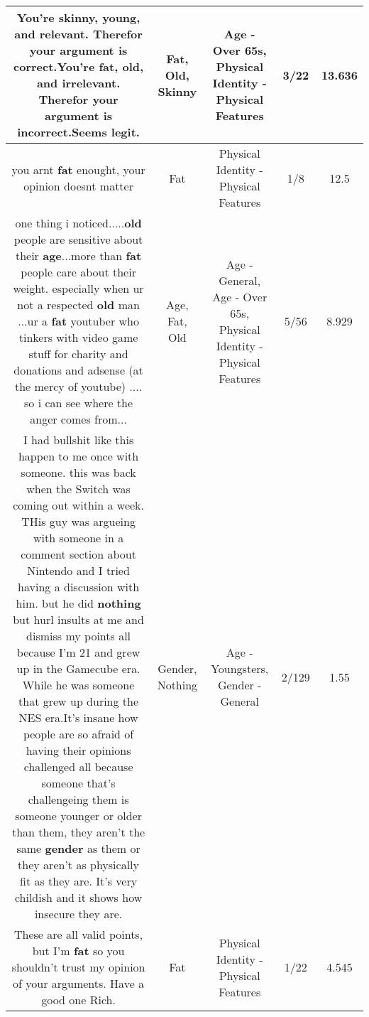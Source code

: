 \documentclass[11pt]{article}
\newlength\mylength
\begin{document}
\begin{center}
\begin{longtable}{|C{.65\mylength}|C{.30\mylength}|C{.12\mylength}|C{.12\mylength}|C{.12\mylength}|}
  \small You're \textbf{skinny}, young, and relevant. Therefor your argument is correct.You're \textbf{fat}, \textbf{old}, and irrelevant. Therefor your argument is incorrect.Seems legit.\normalsize   & Fat, Old, Skinny & Age - Over 65s, Physical Identity - Physical Features & 3/22 & 13.636 \\  \hline
  \small you arnt \textbf{fat} enought, your opinion doesnt matter\normalsize   & Fat & Physical Identity - Physical Features & 1/8 & 12.5 \\  \hline
  \small one thing i noticed.....\textbf{old} people are sensitive about their \textbf{age}...more than \textbf{fat} people care about their weight. especially when ur not a respected \textbf{old} man ...ur a \textbf{fat} youtuber who tinkers with video game stuff for charity and donations and adsense (at the mercy of youtube) .... so i can see where the anger comes from...\normalsize   & Age, Fat, Old & Age - General, Age - Over 65s, Physical Identity - Physical Features & 5/56 & 8.929 \\  \hline
  \small I had bullshit like this happen to me once with someone. this was back when the Switch was coming out within a week. THis guy was argueing with someone in a comment section about Nintendo and I tried having a discussion with him. but he did \textbf{nothing} but hurl insults at me and dismiss my points all because I'm 21 and grew up in the Gamecube era. While he was someone that grew up during the NES era.It's insane how people are so afraid of having their opinions challenged all because someone that's challengeing them is someone younger or older than them, they aren't the same \textbf{gender} as them or they aren't as physically fit as they are. It's very childish and it shows how insecure they are.\normalsize   & Gender, Nothing & Age - Youngsters, Gender - General & 2/129 & 1.55 \\  \hline
  \small These are all valid points, but I'm \textbf{fat} so you shouldn't trust my opinion of your arguments. Have a good one Rich.\normalsize   & Fat & Physical Identity - Physical Features & 1/22 & 4.545 \\  \hline

\end{longtable}
\end{center}
\end{document}
